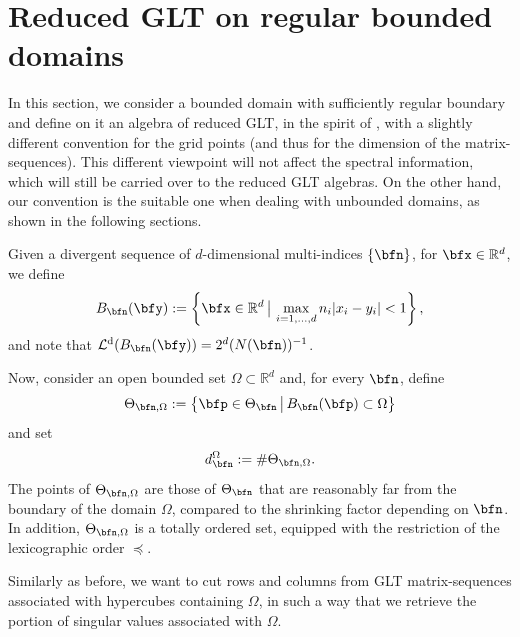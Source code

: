 \documentclass{amsart}
\DeclareMathOperator{\Ld}{\mathcal{L}^d}
\begin{document}
\section{Reduced GLT on regular bounded domains}\label{sec-reduced-glt}

 In this section, we consider a bounded domain with sufficiently regular boundary and define on it an algebra of reduced GLT, in the spirit of \cite{Barb}, with a slightly different convention for the grid points (and thus for the dimension of the matrix-sequences). This different viewpoint will not affect the spectral information, which will still be carried over to the reduced GLT algebras. On the other hand, our convention is the suitable one when dealing with unbounded domains, as shown in the following sections. 

 Given a divergent sequence of $d$-dimensional multi-indices $\{\bfn\}$, for $\bfx\in\mathbb{R}^d$, we define
 \begin{equation*}
     B_{\bfn}(\bfy):=\left\{\bfx\in\mathbb{R}^d \, \big|\,\max_{i=1,\ldots,d}n_i|x_i-y_i|<1\right\},
 \end{equation*}
and note that $\Ld(B_{\bfn}(\bfy))=2^d(N(\bfn))^{-1}$.


Now, consider an open bounded set $\Omega\subset\mathbb{R}^d$ and, for every $\bfn$, define
\begin{equation}\label{def_grid}    
\Theta_{\bfn,\Omega}:=\left\{\bfp\in\Theta_{\bfn}\,\big|\, B_{\bfn}(\bfp)\subset\Omega\right\}
\end{equation}
and set 
\begin{equation*}
    d_{\bfn}^{\Omega}:=\#\Theta_{\bfn,\Omega}.
\end{equation*}
The points of $\Theta_{\bfn,\Omega}$ are those of $\Theta_{\bfn}$ that are reasonably far from the boundary of the domain $\Omega$, compared to the shrinking factor depending on $\bfn$. In addition, $\Theta_{\bfn,\Omega}$ is a totally ordered set, equipped with the restriction of the lexicographic order $\preceq$.

Similarly as before, we want to cut rows and columns from GLT matrix-sequences associated with hypercubes containing $\Omega$, in such a way that we retrieve the portion of singular values associated with $\Omega$. 
\end{document}
